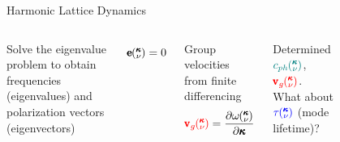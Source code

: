 \documentclass{beamer}
\newcommand{\kv}{\mspace{-4.0mu}\left(\mspace{-8.0mu}
\begin{smallmatrix}&\pmb{\kappa} \\&\nu\end{smallmatrix}
\mspace{-3.0mu}\right)}
\begin{document}
\begin{frame}{Harmonic Lattice Dynamics}
\begin{columns}

Solve the eigenvalue problem to obtain frequencies (eigenvalues) and polarization vectors (eigenvectors)

\begin{equation*}
[D(\pmb{\kappa})-I\omega^2\kv]\pmb{\mathrm{e}}\kv = 0
\end{equation*}

Group velocities from finite differencing%
\begin{equation*}\label{EQ:NMD:vg}
\begin{split}
\textcolor{red}{\pmb{\mathrm{v}}_{g}\kv}=\frac{\partial \omega \kv}{\partial \pmb{\kappa}}
\end{split}
\end{equation*}

Determined $\textcolor{teal}{c_{ph}\kv}$, $\textcolor{red}{\pmb{\mathrm{v}}_{g}\kv}$. What about $\textcolor{blue}{\tau\kv}$ (mode lifetime)?
\begin{figure}[t]
\begin{center}
\vspace*{-0.8cm}
\renewcommand{\figure}{Fig.}
\label{fig:bulk_dis_dos}
\end{center}
\end{figure}
\end{columns}

\end{frame}
\end{document}
